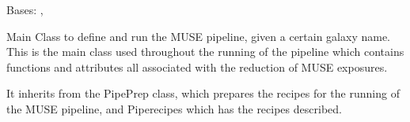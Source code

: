 \documentclass[letterpaper,10pt,english]{sphinxmanual}
\begin{document}
\begin{fulllineitems}
\label{\detokenize{api/pymusepipe:pymusepipe.musepipe.MusePipe}}
\pysigstartsignatures
{}
\pysigstopsignatures
\sphinxAtStartPar
Bases: {\hyperref[\detokenize{api/pymusepipe:pymusepipe.prep_recipes_pipe.PipePrep}]{}}, {\hyperref[\detokenize{api/pymusepipe:pymusepipe.recipes_pipe.PipeRecipes}]{}}

\sphinxAtStartPar
Main Class to define and run the MUSE pipeline, given a certain galaxy
name. This is the main class used throughout the running of the pipeline
which contains functions and attributes all associated with the reduction
of MUSE exposures.

\sphinxAtStartPar
It inherits from the PipePrep class, which prepares the recipes for the
running of the MUSE pipeline, and Piperecipes which has the recipes
described.


\end{fulllineitems}
\end{document}
